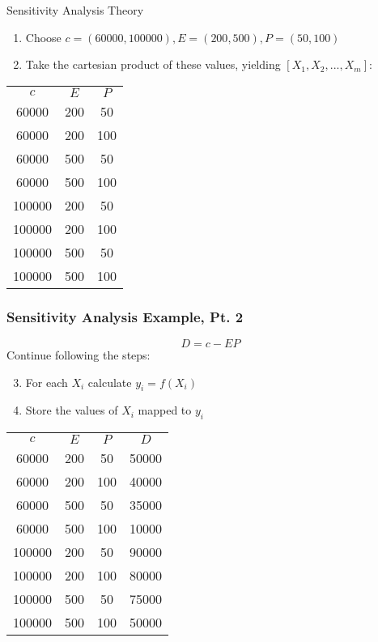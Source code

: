 \documentclass[handout, 11pt]{beamer}
\begin{document}
\begin{section}[SA Theory]{Sensitivity Analysis Theory}
\begin{frame}
\begin{enumerate}
\item Choose
$c = (60000, 100000), E = (200, 500), P = (50, 100)$
\item Take the cartesian product of these values, yielding
$[X_1, X_2, ..., X_m]:$
\end{enumerate}
\begin{tabular}{ccc}
$c$ & $E$ & $P$\\
  60000 &  200 &   50 \\
  60000 &  200 &  100 \\
  60000 &  500 &   50 \\
  60000 &  500 &  100 \\
 100000 &  200 &   50 \\
 100000 &  200 &  100 \\
 100000 &  500 &   50 \\
 100000 &  500 &  100 \\

\end{tabular}
\end{frame}
\begin{frame}
\frametitle{Sensitivity Analysis Example, Pt. 2}
\begin{equation}
	D = c - EP
\end{equation}
Continue following the steps:
\begin{enumerate}
\setcounter{enumi}{2}
\item For each
$X_i$
calculate
$y_i = f(X_i)$
\item Store the values of
$X_i$
mapped to
$y_i$
\end{enumerate}
\begin{tabular}{cccc}
$c$ & $E$ & $P$ & $D$\\
  60000 &  200 &   50 &  50000 \\
  60000 &  200 &  100 &  40000 \\
  60000 &  500 &   50 &  35000 \\
  60000 &  500 &  100 &  10000 \\
 100000 &  200 &   50 &  90000 \\
 100000 &  200 &  100 &  80000 \\
 100000 &  500 &   50 &  75000 \\
 100000 &  500 &  100 &  50000 \\

\end{tabular}
\end{frame}
\end{section}
\end{document}
